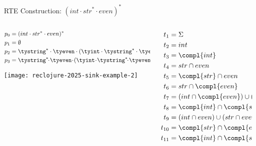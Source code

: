 {\begin{frame}{RTE Construction: $(int \cdot str^{*} \cdot even)^{*}$}
  \begin{columns}
    \begin{column}{0.5\textwidth}
      \begin{align*}
        p_0 &= (int \cdot str^{*} \cdot even)^{*}\\
        p_1 &= \emptyset\\
        p_2 &= \tystring^{*} \cdot \tyeven \cdot (\tyint \cdot \tystring^{*} \cdot \tyeven)^{*}\\
        p_3 &= \tystring^{*}\!\!\cdot\! \tyeven\!\cdot\! (\tyint\! \cdot\! \tystring^{*}\!\!\cdot\! \tyeven)^{*}\! \reor (\tyint\! \cdot\! \tystring^{*}\!\!\cdot\!\! \tyeven)^{*}
      \end{align*}



      \texttt{[image: reclojure-2025-sink-example-2]}
    \end{column}
    \begin{column}{0.5\textwidth}
      \begin{align*}
        t_1 &= \Sigma\\
        t_2 &= int  \\
        t_3 &= \compl{int}\\
        t_4 &= str \cap even\\
        t_5 &= \compl{str} \cap even\\
        t_6 &= str \cap \compl{even}\\
        t_7 &= (int \cap \compl{even}) \cup (str \cap \compl{even})\\
        t_8   &=\compl{int} \cap \compl{str} \cap even\\
        t_9 &=(int \cap even) \cup (str \cap even)\\
        t_{10} &=\compl{str} \cap \compl{even}\\
        t_{11} &=\compl{int} \cap \compl{str} \cap \compl{even}
      \end{align*}
    \end{column}
  \end{columns}
\end{frame}


      
}
